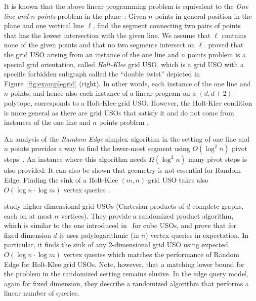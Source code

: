 \documentclass[runningheads,a4paper]{llncs}
\newcommand{\AT}[1]{\marginpar{\parbox{3.6cm}{{\small {\bf AT:} #1}}}} %
\begin{document}
It is known that the above linear programming problem is equivalent to the \emph{One line and $n$ points} problem in the plane~\cite{linepoint,welzl2001entering}:
Given $n$ points in general position in the plane and one vertical line $\ell$, find the segment connecting two pairs of points that has the lowest intersection with the given line. 
We assume that $\ell$ contains none of the given points and that no two segments intersect on $\ell$.
\citet{linepoint} proved that the grid USO arising from an instance of the one line and $n$ points problem is a special grid orientation, called \emph{Holt-Klee} grid USO, which is a grid USO with a specific forbidden subgraph called the ``double twist'' depicted in Figure~\ref{fig:examplegrid} (right). In other words, each instance of the one line and $n$ points, and hence also each instance of a linear program on a $(d, d+2)$-polytope, corresponds to a Holt-Klee grid USO. 
However, the Holt-Klee condition is more general as there are grid USOs that satisfy it and  do not come from instances of the one line and $n$ points problem \cite{grid05}. 

An analysis of the \emph{Random Edge} simplex algorithm in the setting of one line and $n$ points provides a way to find the lower-most segment using $O(\log^2 n )$ pivot steps~\cite{linepoint}. 
An instance where this algorithm needs $\Omega(\log^2 n )$ many pivot steps is also provided. 
It can also be shown that geometry is not essential for Random Edge: Finding the sink of a Holt-Klee $(m,n)$-grid USO takes also $O(\log n\cdot\log m)$ vertex queries~\cite{grid05,falkthesis}. 


\citet{grid08} study higher dimensional grid USOs (Cartesian products of $d$ complete graphs, each on at most $n$ vertices). 
They provide a randomized product algorithm, which is similar to the one introduced in~\cite{SW} for cube USOs, and prove that for fixed dimension $d$ it uses polylogarithmic (in $n$) vertex queries in expectation. 
In particular, it finds the sink of any 2-dimensional grid USO using expected $O(\log n \cdot \log m)$ vertex queries which matches the performance of Random Edge for Holt-Klee grid USOs. Note, however, that a matching lower bound for the problem in the randomized setting remains elusive.
In the edge query model, again for fixed dimension, they describe a randomized algorithm that performs a linear number of queries.
\end{document}
